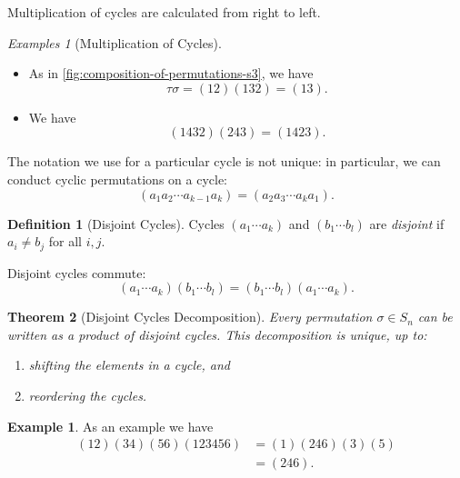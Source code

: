 \documentclass{article}
\newtheorem{theorem}{Theorem}[section]
\theoremstyle{definition}
\newtheorem{definition}[theorem]{Definition}
\newtheorem*{example*}{Example}
\theoremstyle{remark}
\newcommand{\pqty}[1]{\left(#1\right)}
\newcommand{\perm}[1]{(#1)}
\newtheorem*{examples*}{Examples}
\begin{document}
Multiplication of cycles are calculated from right to left.

\begin{examples*}[Multiplication of Cycles]
    \begin{itemize}
        \item As in \autoref{fig:composition-of-permutations-s3}, we have
        \[
            \tau \sigma = \perm{12}\perm{132} = \perm{13}.
        \]
        \item We have
        \[
            \perm{1432}\perm{243} = \perm{1423}.
        \]
    \end{itemize}
\end{examples*}

The notation we use for a particular cycle is not unique: in particular, we can conduct cyclic permutations on a cycle:
\[
    \perm{{a_1} {a_2} \cdots {a_{k - 1}} {a_k}} = \perm{{a_2} {a_3} \cdots {a_k} {a_1}}.
\]

\begin{definition}[Disjoint Cycles]
    \label{def:disjoint-cycles}%
    Cycles \(\perm{{a_1} \cdots {a_k}}\) and \(\perm{{b_1} \cdots {b_l}}\) are \emph{disjoint} if \(a_i \neq b_j\) for all \(i, j\).
\end{definition}

Disjoint cycles commute:
\[
    \perm{{a_1} \cdots {a_k}} \perm{{b_1} \cdots {b_l}} = \perm{{b_1} \cdots {b_l}} \perm{{a_1} \cdots {a_k}}.
\]

\begin{theorem}[Disjoint Cycles Decomposition]
    \label{thm:disjoint-cycles-decomposition}%
    Every permutation \(\sigma \in S_n\) can be written as a product of disjoint cycles. This decomposition is unique, up to:
    \begin{enumerate}
        \item shifting the elements in a cycle, and
        \item reordering the cycles.
    \end{enumerate}
\end{theorem}

\begin{example*}
    As an example we have
    \begin{align*}
        \perm{12}\perm{34}\perm{56}\perm{123456} &= \pqty{1} \perm{246} \pqty{3} \pqty{5} \\
        &= \perm{246}.
    \end{align*}
\end{example*}
\end{document}
